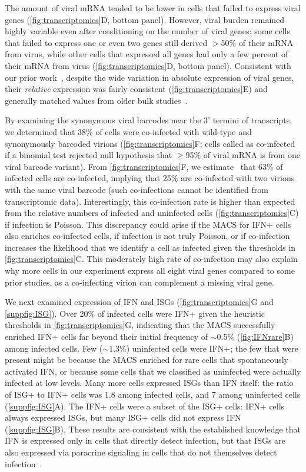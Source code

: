 \documentclass[10pt,letterpaper]{article}
\newcommand{\FIG}[1]{\autoref{fig:#1}}
\newcommand{\SUPPFIG}[1]{\autoref{suppfig:#1}}
\begin{document}
The amount of viral mRNA tended to be lower in cells that failed to express viral genes (\FIG{transcriptomics}D, bottom panel).
However, viral burden remained highly variable even after conditioning on the number of viral genes: some cells that failed to express one or even two genes still derived $>$50\% of their mRNA from virus, while other cells that expressed all genes had only a few percent of their mRNA from virus (\FIG{transcriptomics}D, bottom panel).
Consistent with our prior work~\cite{russell2018extreme}, despite the wide variation in absolute expression of viral genes, their \emph{relative} expression was fairly consistent (\FIG{transcriptomics}E) and generally matched values from older bulk studies~\cite{hatada1989control}.

By examining the synonymous viral barcodes near the 3' termini of transcripts, we determined that 38\% of cells were co-infected with wild-type and synonymously barcoded virions (\FIG{transcriptomics}F; cells called as co-infected if a binomial test rejected null hypothesis that $\ge$95\% of viral mRNA is from one viral barcode variant).
From \FIG{transcriptomics}F, we estimate~\cite{bloom2018estimating} that 63\% of infected cells are co-infected, implying that 25\% are co-infected with two virions with the same viral barcode (such co-infections cannot be identified from transcriptomic data).
Interestingly, this co-infection rate is higher than expected from the relative numbers of infected and uninfected cells (\FIG{transcriptomics}C) if infection is Poisson.
This discrepancy could arise if the MACS for IFN+ cells also enriches co-infected cells, if infection is not truly Poisson, or if co-infection increases the likelihood that we identify a cell as infected given the thresholds in \FIG{transcriptomics}C.
This moderately high rate of co-infection may also explain why more cells in our experiment express all eight viral genes compared to some prior studies, as a co-infecting virion can complement a missing viral gene. 

We next examined expression of IFN and ISGs (\FIG{transcriptomics}G and \SUPPFIG{ISG}).
Over 20\% of infected cells were IFN+ given the heuristic thresholds in \FIG{transcriptomics}G, indicating that the MACS successfully enriched IFN+ cells far beyond their initial frequency of $\sim$0.5\% (\FIG{IFNrare}B) among infected cells.
Few ($\sim$1.3\%) uninfected cells were IFN+; the few that were present might be because the MACS enriched for rare cells that spontaneously activated IFN, or because some cells that we classified as uninfected were actually infected at low levels.
Many more cells expressed ISGs than IFN itself: the ratio of ISG+ to IFN+ cells was 1.8 among infected cells, and 7 among uninfected cells (\SUPPFIG{ISG}A).
The IFN+ cells were a subset of the ISG+ cells: IFN+ cells always expressed ISGs, but many ISG+ cells did not express IFN (\SUPPFIG{ISG}B).
These results are consistent with the established knowledge that IFN is expressed only in cells that directly detect infection, but that ISGs are also expressed via paracrine signaling in cells that do not themselves detect infection~\cite{stetson2006type,honda2006type}.
\end{document}
